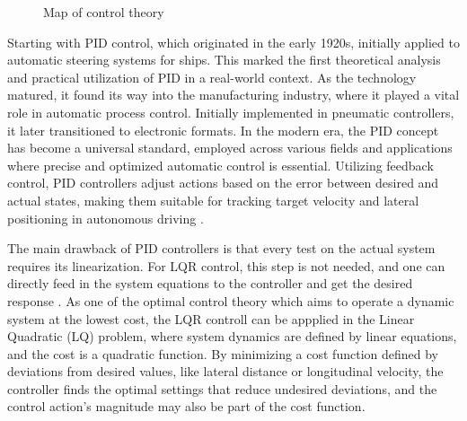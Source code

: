 \begin{figure}[h]
\centering
{}
\caption{Map of control theory\parencite{EngineeringMedia}}
\label{fig: control map}
\end{figure}

Starting with PID control, which originated in the early 1920s, initially applied to automatic steering systems for ships. This marked the first theoretical analysis and practical utilization of PID in a real-world context. As the technology matured, it found its way into the manufacturing industry, where it played a vital role in automatic process control. Initially implemented in pneumatic controllers, it later transitioned to electronic formats. In the modern era, the PID concept has become a universal standard, employed across various fields and applications where precise and optimized automatic control is essential. Utilizing feedback control, PID controllers adjust actions based on the error between desired and actual states, making them suitable for tracking target velocity and lateral positioning in autonomous driving \parencite{bennett1996brief}. 

The main drawback of PID controllers is that every test on the actual system requires its linearization. For LQR control, this step is not needed, and one can directly feed in the system equations to the controller and get the desired response \parencite{saraf2020comparative}. As one of the optimal control theory which aims to operate a dynamic system at the lowest cost, the LQR controll can be appplied in the Linear Quadratic (LQ) problem, where system dynamics are defined by linear equations, and the cost is a quadratic function. By minimizing a cost function defined by deviations from desired values, like lateral distance or longitudinal velocity, the controller finds the optimal settings that reduce undesired deviations, and the control action's magnitude may also be part of the cost function.

